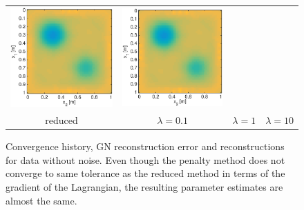 \documentclass{iopart}
\begin{document}
\begin{figure}
\begin{tabular}{cccc}
\includegraphics[scale=.2]{./figs/2D_exp1_h}&
\includegraphics[scale=.2]{./figs/2D_exp1_i}\\
{\small reduced}&{\small $\lambda=0.1$}&{\small $\lambda=1$}&{\small $\lambda=10$}\\
\end{tabular}
\caption{Convergence history, GN reconstruction error and reconstructions for data without noise. Even though the penalty method does not converge to same tolerance as the reduced method in terms of the gradient of the Lagrangian, the resulting parameter estimates are almost the same.}
\label{fig:2D_exp1}
\end{figure}
\end{document}
